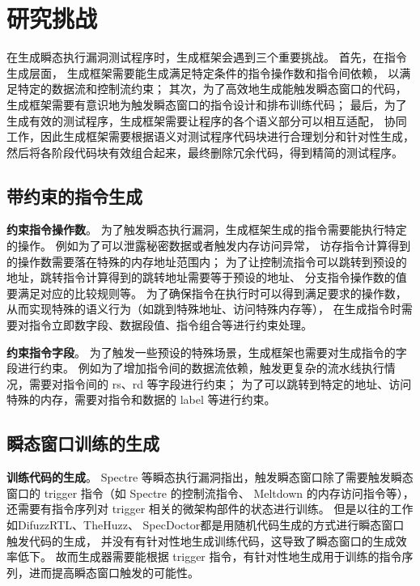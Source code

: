\cleardoublepage
\section{研究挑战}

在生成瞬态执行漏洞测试程序时，生成框架会遇到三个重要挑战。
首先，在指令生成层面，
生成框架需要能生成满足特定条件的指令操作数和指令间依赖，
以满足特定的数据流和控制流约束；
其次，为了高效地生成能触发瞬态窗口的代码，
生成框架需要有意识地为触发瞬态窗口的指令设计和排布训练代码；
最后，为了生成有效的测试程序，生成框架需要让程序的各个语义部分可以相互适配，
协同工作，因此生成框架需要根据语义对测试程序代码块进行合理划分和针对性生成，
然后将各阶段代码块有效组合起来，最终删除冗余代码，得到精简的测试程序。\par

\subsection{带约束的指令生成}
\textbf{约束指令操作数}。
为了触发瞬态执行漏洞，生成框架生成的指令需要能执行特定的操作。
例如为了可以泄露秘密数据或者触发内存访问异常，
访存指令计算得到的操作数需要落在特殊的内存地址范围内；
为了让控制流指令可以跳转到预设的地址，跳转指令计算得到的跳转地址需要等于预设的地址、
分支指令操作数的值要满足对应的比较规则等。
为了确保指令在执行时可以得到满足要求的操作数，从而实现特殊的语义行为（如跳到特殊地址、访问特殊内存等），
在生成指令时需要对指令立即数字段、数据段值、指令组合等进行约束处理。\par

\textbf{约束指令字段}。
为了触发一些预设的特殊场景，生成框架也需要对生成指令的字段进行约束。
例如为了增加指令间的数据流依赖，触发更复杂的流水线执行情况，需要对指令间的 rs、rd 等字段进行约束；
为了可以跳转到特定的地址、访问特殊的内存，需要对指令和数据的 label 等进行约束。\par

\subsection{瞬态窗口训练的生成}
\textbf{训练代码的生成}。
Spectre 等瞬态执行漏洞指出，触发瞬态窗口除了需要触发瞬态窗口的 trigger 指令（如 Spectre 的控制流指令、
Meltdown 的内存访问指令等），还需要有指令序列对 trigger 相关的微架构部件的状态进行训练。
但是以往的工作如DifuzzRTL\cite{hur2021difuzzrtl}、TheHuzz\cite{kande2022thehuzz}、
SpecDoctor\cite{hur2022specdoctor}都是用随机代码生成的方式进行瞬态窗口触发代码的生成，
并没有有针对性地生成训练代码，这导致了瞬态窗口的生成效率低下。
故而生成器需要能根据 trigger 指令，有针对性地生成用于训练的指令序列，进而提高瞬态窗口触发的可能性。\par

